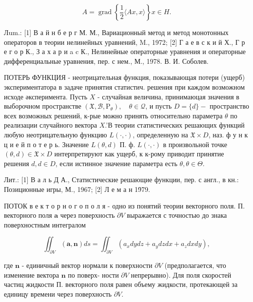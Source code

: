 \documentclass[10pt]{article}
\begin{document}
\[

A=\operatorname{grad}\left\{\frac{1}{2}\langle A x, x\rangle\right\} x \in H .

\]



Лum.: [1] В а й н б е р г М. М., Вариационный метод и метод монотонных операторов в теории нелинейных уравнений, M., 1972; [2] Г а е в с к и й Х., Г р е г о р К., З а х а р и a c К., Нелинейные операторные уравнения и операторные дифференциальные уравнения, пер. с нем., М., 1978. В. И. Соболев.



ПОТЕРЬ ФУНКЦИЯ - неотрицательная функция, показывающая потери (ущерб) экспериментатора в задаче принятия статистич. решения при каждом возможном исходе әксперимента. Пусть $X$ - случайная величина, принимаюцая значения в выборочном пространстве $\left(\mathfrak{X}, \mathscr{B}, \mathrm{P}_{\theta}\right), \quad \theta \in \mathcal{Q}$, и пусть $D=\{d\}-$ пространство всех возможных решений, к-рые можно принять относительно параметра $\theta$ по реализации случайного вектора $X$.'В теории статистических решающих функций любую неотрицательную функцию $L(\cdot, \cdot)$, определенную на $\mathfrak{X} \times D$, наз. ф у н к ц и е й п о т е р ь. Значение $L(\theta, d)$ П. ф. $L(\cdot, \cdot)$ в произвольной точке $(\theta, d) \in \mathfrak{X} \times D$ интерпретируют как ущерб, к к-рому приводит принятие решения $d, d \in D$, если истинное значение параметра есть $\theta, \theta \in \Theta$.



Лит.: [1] В а л ь Д А., Статистические решающие функции, пер. с англ., в кн.: Позиционные игры, М., 1967; [2] Л е м а н 19̈79.



ПОТОК в е к т о р н о г о п о л я - одно из понятий теории векторного поля. П. векторного поля $\boldsymbol{a}$ через поверхность $\partial V$ выражается с точностью до знака поверхностным интегралом



\[

\iint_{\partial V}(\boldsymbol{a}, \boldsymbol{n}) d s=\iint_{\partial V}\left(a_{x} d y d z+a_{y} d z d x+a_{z} d x d y\right),

\]



где $\boldsymbol{n}$ - единичный вектор нормали к поверхности $\partial V$ (предполагается, что изменение вектора $\boldsymbol{n}$ по поверх- ности $\partial V$ непрерывно). Для поля скоростей частиц жидкости П. векторного поля равен объему жидкости, протекающей за единицу времени через поверхность $\partial V$.
\end{document}
